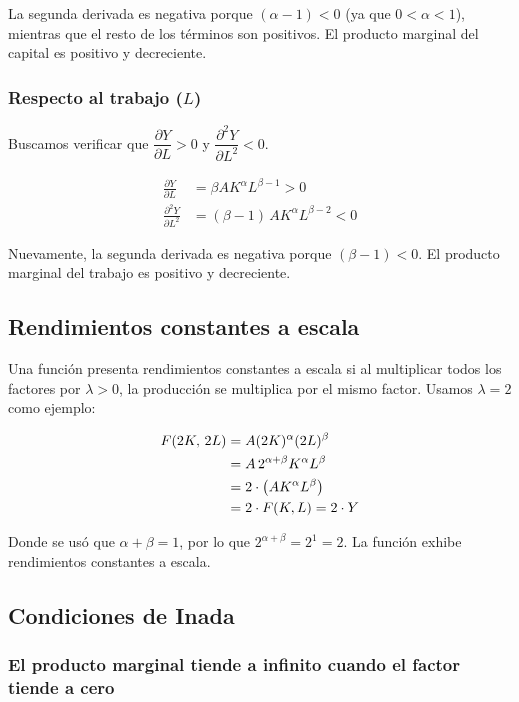 \documentclass[11pt,a4paper]{article}
\begin{document}
La segunda derivada es negativa porque $(\alpha - 1) < 0$ (ya que $0 < \alpha < 1$), mientras que el resto de los términos son positivos. El producto marginal del capital es positivo y decreciente.

\subsubsection{Respecto al trabajo ($L$)}

Buscamos verificar que $\dfrac{\partial Y}{\partial L} > 0$ y $\dfrac{\partial^2 Y}{\partial L^2} < 0$.

\begin{align}
    \frac{\partial Y}{\partial L} &= \beta A K^{\alpha} L^{\beta-1} > 0 \\[6pt]
    \frac{\partial^2 Y}{\partial L^2} &= (\beta-1)\, A K^{\alpha} L^{\beta-2} < 0
\end{align}

Nuevamente, la segunda derivada es negativa porque $(\beta - 1) < 0$. El producto marginal del trabajo es positivo y decreciente.

\subsection{Rendimientos constantes a escala}

Una función presenta rendimientos constantes a escala si al multiplicar todos los factores por $\lambda > 0$, la producción se multiplica por el mismo factor. Usamos $\lambda = 2$ como ejemplo:

\begin{align}
    F(2K,\, 2L) &= A (2K)^{\alpha}(2L)^{\beta} \notag \\
    &= A \, 2^{\alpha+\beta} K^{\alpha} L^{\beta} \notag \\
    &= 2 \cdot \left( A K^{\alpha} L^{\beta}\right) \notag \\
    &= 2 \cdot F(K,L) = 2 \cdot Y
\end{align}

Donde se usó que $\alpha + \beta = 1$, por lo que $2^{\alpha+\beta} = 2^{1} = 2$. La función exhibe rendimientos constantes a escala.

\subsection{Condiciones de Inada}

\subsubsection{El producto marginal tiende a infinito cuando el factor tiende a cero}
\end{document}
